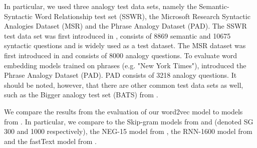 In particular, we used three analogy test data sets, namely the Semantic-Syntactic Word Relationship test set (SSWR), the Microsoft Research Syntactic Analogies Dataset (MSR) and the Phrase Analogy Dataset (PAD). The SSWR test data set was first introduced in \cite{mikolov2013a}, consists of 8869 semantic and 10675 syntactic questions and is widely used as a test dataset. The MSR dataset was first introduced in \cite{mikolov-etal-2013-linguistic} and consists of 8000 analogy questions. To evaluate word embedding models trained on phrases (e.g. "New York Times"), \cite{mikolov2013b} introduced the Phrase Analogy Dataset (PAD). PAD consists of 3218 analogy questions. It should be noted, however, that there are other common test data sets as well, such as the Bigger analogy test set (BATS) from \cite{gladkova-etal-2016-analogy}.

We compare the results from the evaluation of our word2vec model to models from \cite{mikolov2013a, mikolov2013b, mikolov-etal-2013-linguistic, bojanowski2017enriching}. In particular, we compare to the Skip-gram models from \cite[Table 3]{mikolov2013a} and \cite[Table 6]{mikolov2013a} (denoted SG 300 and 1000 respectively), the NEG-15 model from \cite[Table 1 and 3]{mikolov2013b}, the RNN-1600 model from \cite[Table 2]{mikolov-etal-2013-linguistic} and the fastText model from \cite[Table 2]{bojanowski2017enriching}.

